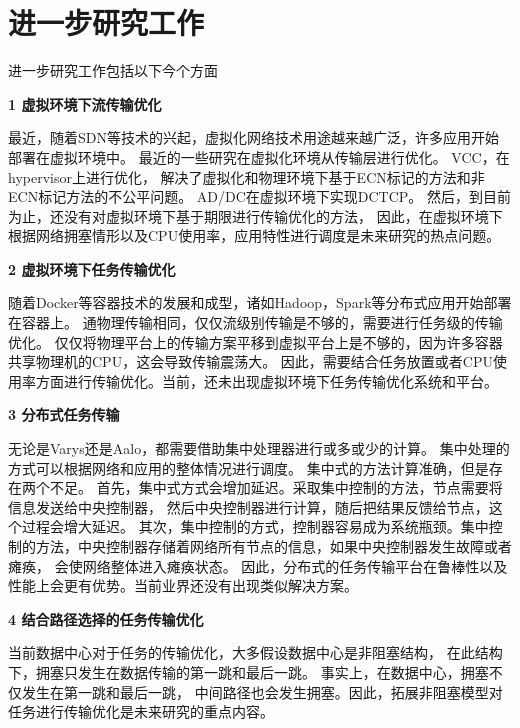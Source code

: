 \section{进一步研究工作}
进一步研究工作包括以下今个方面

\textbf{1 虚拟环境下流传输优化}

最近，随着SDN等技术的兴起，虚拟化网络技术用途越来越广泛，许多应用开始部署在虚拟环境中。
最近的一些研究\cite{He2016AC,Cronkite2016Virtualized}在虚拟化环境从传输层进行优化。
VCC\cite{Cronkite2016Virtualized}，在hypervisor上进行优化，
解决了虚拟化和物理环境下基于ECN标记的方法和非ECN标记方法的不公平问题。
AD/DC\cite{He2016AC}在虚拟环境下实现DCTCP。
然后，到目前为止，还没有对虚拟环境下基于期限进行传输优化的方法，
因此，在虚拟环境下根据网络拥塞情形以及CPU使用率，应用特性进行调度是未来研究的热点问题。



\textbf{2 虚拟环境下任务传输优化}

随着Docker等容器技术的发展和成型，诸如Hadoop，Spark等分布式应用开始部署在容器上。
通物理传输相同，仅仅流级别传输是不够的，需要进行任务级的传输优化。
仅仅将物理平台上的传输方案平移到虚拟平台上是不够的，因为许多容器共享物理机的CPU，这会导致传输震荡大。
因此，需要结合任务放置或者CPU使用率方面进行传输优化。当前，还未出现虚拟环境下任务传输优化系统和平台。


\textbf{3 分布式任务传输}

无论是Varys还是Aalo，都需要借助集中处理器进行或多或少的计算。
集中处理的方式可以根据网络和应用的整体情况进行调度。
集中式的方法计算准确，但是存在两个不足。
首先，集中式方式会增加延迟。采取集中控制的方法，节点需要将信息发送给中央控制器，
然后中央控制器进行计算，随后把结果反馈给节点，这个过程会增大延迟。
其次，集中控制的方式，控制器容易成为系统瓶颈。集中控制的方法，中央控制器存储着网络所有节点的信息，如果中央控制器发生故障或者瘫痪，
会使网络整体进入瘫痪状态。
因此，分布式的任务传输平台在鲁棒性以及性能上会更有优势。当前业界还没有出现类似解决方案。




\textbf{4 结合路径选择的任务传输优化}

当前数据中心对于任务的传输优化，大多假设数据中心是非阻塞结构，
在此结构下，拥塞只发生在数据传输的第一跳和最后一跳。
事实上，在数据中心，拥塞不仅发生在第一跳和最后一跳，
中间路径也会发生拥塞。因此，拓展非阻塞模型对任务进行传输优化是未来研究的重点内容。


